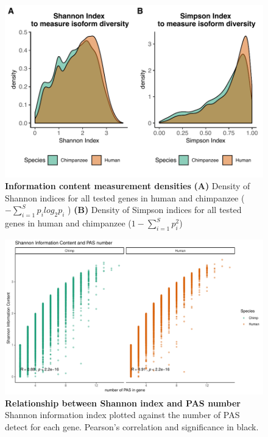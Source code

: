 \begin{figure}[!htb]
\centering
\includegraphics[width=5in]{img/ch03/Fig2-figSup4.pdf}
\caption[Information content measurement densities]{\textbf{Information content measurement densities} {\bf (A)}  Density of Shannon indices for all tested genes in human and chimpanzee ( $- \sum_{i=1}^{S} p_{i}log_{2}p_{i}$ ) {\bf (B)}  Density of Simpson indices for all tested genes in human and chimpanzee ($1 - \sum_{i=1}^{S} p^{2}_{i}$)  }
\label{fig:ch03-bothDensities}
\end{figure}
\clearpage


\begin{figure}[!htb]
\centering
\includegraphics[width=5in]{img/ch03/Fig2-figSup5.pdf}
\caption[Relationship between Shannon index and PAS number ]{\textbf{Relationship between Shannon index and PAS number} Shannon information index plotted against the number of PAS detect for each gene. Pearson's correlation and significance in black. }
\label{fig:ch03-shanonNum}
\end{figure}
\clearpage

